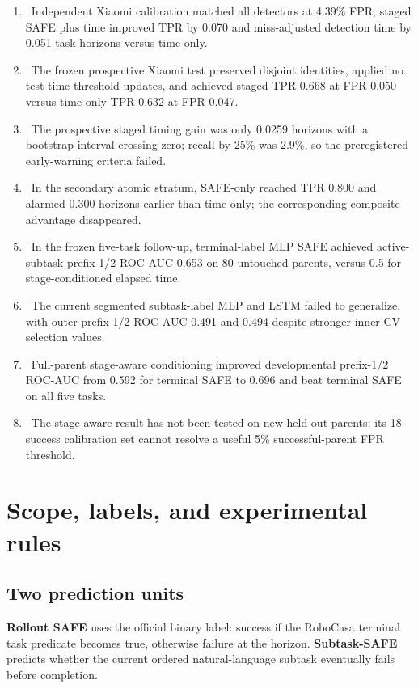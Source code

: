 \documentclass[11pt,a4paper]{article}
\newcommand{\good}{\textcolor{teal}{\ding{51}}}
\newcommand{\bad}{\textcolor{orange}{\ding{55}}}
\begin{document}
\begin{enumerate}
\item \good\ Independent Xiaomi calibration matched all detectors at 4.39\% FPR; staged SAFE plus time improved TPR by 0.070 and miss-adjusted detection time by 0.051 task horizons versus time-only.
\item \good\ The frozen prospective Xiaomi test preserved disjoint identities, applied no test-time threshold updates, and achieved staged TPR 0.668 at FPR 0.050 versus time-only TPR 0.632 at FPR 0.047.
\item \bad\ The prospective staged timing gain was only 0.0259 horizons with a bootstrap interval crossing zero; recall by 25\% was 2.9\%, so the preregistered early-warning criteria failed.
\item \good\ In the secondary atomic stratum, SAFE-only reached TPR 0.800 and alarmed 0.300 horizons earlier than time-only; the corresponding composite advantage disappeared.
\item \good\ In the frozen five-task follow-up, terminal-label MLP SAFE achieved active-subtask prefix-1/2 ROC-AUC 0.653 on 80 untouched parents, versus 0.5 for stage-conditioned elapsed time.
\item \bad\ The current segmented subtask-label MLP and LSTM failed to generalize, with outer prefix-1/2 ROC-AUC 0.491 and 0.494 despite stronger inner-CV selection values.
\item \good\ Full-parent stage-aware conditioning improved developmental prefix-1/2 ROC-AUC from 0.592 for terminal SAFE to 0.696 and beat terminal SAFE on all five tasks.
\item \bad\ The stage-aware result has not been tested on new held-out parents; its 18-success calibration set cannot resolve a useful 5\% successful-parent FPR threshold.
\end{enumerate}

\section{Scope, labels, and experimental rules}

\subsection{Two prediction units}
\textbf{Rollout SAFE} uses the official binary label: success if the RoboCasa terminal task predicate becomes true, otherwise failure at the horizon. \textbf{Subtask-SAFE} predicts whether the current ordered natural-language subtask eventually fails before completion.
\end{document}
